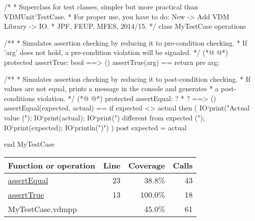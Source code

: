\begin{vdmpp}
/*
 * Superclass for test classes, simpler but more practical than VDMUnit`TestCase.
 * For proper use, you have to do: New -> Add VDM Library -> IO.
 * JPF, FEUP, MFES, 2014/15.
 */
class MyTestCase
operations

  /**
   * Simulates assertion checking by reducing it to pre-condition checking.
   * If 'arg' does not hold, a pre-condition violation will be signaled.
   */
(*@
\label{assertTrue:13}
@*)
  protected assertTrue: bool ==> ()
  assertTrue(arg) ==
    return
  pre arg;

  /**
   * Simulates assertion checking by reducing it to post-condition checking.
   * If values are not equal, prints a message in the console and generates
   * a post-conditions violation.
   */
(*@
\label{assertEqual:23}
@*)
  protected assertEqual: ? * ? ==> ()
  assertEqual(expected, actual) ==
    if expected <> actual then (
      IO`print("Actual value (");
      IO`print(actual);
      IO`print(") different from expected (");
      IO`print(expected);
      IO`println(")\n")
    )
  post expected = actual

end MyTestCase
\end{vdmpp}
\bigskip
\begin{longtable}{|l|r|r|r|}
\hline
Function or operation & Line & Coverage & Calls \\
\hline
\hline
\hyperref[assertEqual:23]{assertEqual} & 23&38.8\% & 43 \\
\hline
\hyperref[assertTrue:13]{assertTrue} & 13&100.0\% & 18 \\
\hline
\hline
MyTestCase.vdmpp & & 45.0\% & 61 \\
\hline
\end{longtable}